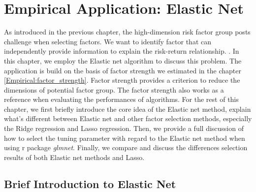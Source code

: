 \chapter{Empirical Application: Elastic Net}\label{Empirical:Elastic_net}
As introduced in the previous chapter, the high-dimension risk factor group posts challenge when selecting factors.
We want to identify factor that can independently provide information to explain the risk-return relationship. \cite{Cochrane2011}.
In this chapter, we employ the Elastic net algorithm to discuss this problem.
The application is build on the basis of factor strength we estimated in the chapter \ref{Empirical:factor_strength}.
Factor strength provides a criterion to reduce the dimensions of potential factor group.
The factor strength also works as a reference when evaluating the performances of algorithms.
For the rest of this chapter, we first briefly introduce the core idea of the Elastic net method, explain what's different between Elastic net and other factor selection methods, especially the Ridge regression and Lasso regression.
Then, we provide a full discussion of how to select the tuning parameter with regard to the Elastic net method when using r package \textit{glmnet}.
Finally, we compare and discuss the differences selection results of both Elastic net methods and Lasso.


\section{Brief Introduction to Elastic Net} \label{Elastic_Net}

